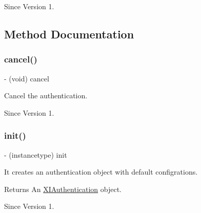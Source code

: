\begin{DoxySince}{Since}
Version 1. 
\end{DoxySince}


\subsection{Method Documentation}
\hypertarget{class_x_i_authentication_a7bf5b124824916d29f13aaff466982c9}{}\label{class_x_i_authentication_a7bf5b124824916d29f13aaff466982c9} 
\subsubsection{\texorpdfstring{cancel()}{cancel()}}
{\footnotesize\ttfamily -\/ (void) cancel \begin{DoxyParamCaption}{ }\end{DoxyParamCaption}}



Cancel the authentication. 

\begin{DoxySince}{Since}
Version 1. 
\end{DoxySince}
\hypertarget{class_x_i_authentication_adc69456604cafb7618c940a3b93e7616}{}\label{class_x_i_authentication_adc69456604cafb7618c940a3b93e7616} 
\subsubsection{\texorpdfstring{init()}{init()}}
{\footnotesize\ttfamily -\/ (instancetype) init \begin{DoxyParamCaption}{ }\end{DoxyParamCaption}}



It creates an authentication object with default configrations. 

\begin{DoxyReturn}{Returns}
An \hyperlink{class_x_i_authentication}{X\+I\+Authentication} object. 
\end{DoxyReturn}
\begin{DoxySince}{Since}
Version 1. 
\end{DoxySince}
\hypertarget{class_x_i_authentication_ab2a3d72425cbd6ae9910016f727198c1}{}\label{class_x_i_authentication_ab2a3d72425cbd6ae9910016f727198c1} 
